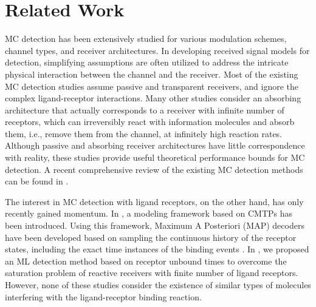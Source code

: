 \documentclass[twocolumn]{IEEEtran}
\begin{document}


\section{Related Work}
\label{sec:related}
MC detection has been extensively studied for various modulation schemes, channel types, and receiver architectures. In developing received signal models for detection, simplifying assumptions are often utilized to address the intricate physical interaction between the channel and the receiver. Most of the existing MC detection studies assume passive and transparent receivers, and ignore the complex ligand-receptor interactions. Many other studies consider an absorbing architecture that actually corresponds to a receiver with infinite number of receptors, which can irreversibly react with information molecules and absorb them, i.e., remove them from the channel, at infinitely high reaction rates. Although passive and absorbing receiver architectures have little correspondence with reality, these studies provide useful theoretical performance bounds for MC detection. A recent comprehensive review of the existing MC detection methods can be found in \cite{kuscu2019transmitter}. 

The interest in MC detection with ligand receptors, on the other hand, has only recently gained momentum. In \cite{chou2013extended, chou2015markovian}, a modeling framework based on CMTPs has been introduced. Using this framework, Maximum A Posteriori (MAP) decoders have been developed based on sampling the continuous history of the receptor states, including the exact time instances of the binding events \cite{chou2015maximum, chou2019designing}. In \cite{kuscu2018maximum}, we proposed an ML detection method based on receptor unbound times to overcome the saturation problem of reactive receivers with finite number of ligand receptors. However, none of these studies consider the existence of similar types of molecules interfering with the ligand-receptor binding reaction. 
\end{document}
